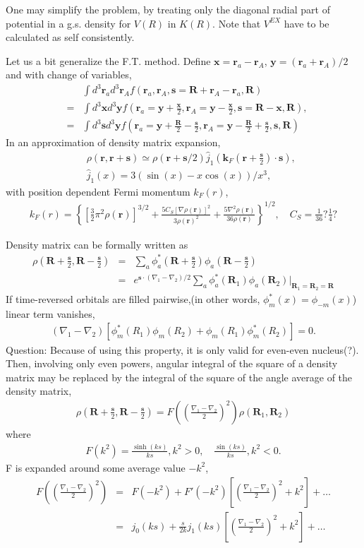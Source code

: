 \documentclass[11pt]{book}
\def\bm{\boldsymbol}
\def\vr{{\bm r}}
\def\vR{{\bm R}}
\newcommand{\bea}{\begin{eqnarray}}
\newcommand{\eea}{\end{eqnarray}}
\newcommand{\no}{\nonumber \\}
\begin{document}
One may simplify the problem, by treating only the diagonal radial part of potential 
in a g.s. density for $V(R)$ in $K(R)$. 
Note that $V^{EX}$ have to be calculated as self consistently. 

Let us a bit generalize the F.T. method. 
Define ${\bm x}={\bm r}_a-{\bm r}_A$, ${\bm y}=(\vr_a+\vr_A)/2$
and with change of variables, 
\bea 
& &\int d^3\vr_a d^3 \vr_A f(\vr_a,\vr_A,{\bm s}=\vR+\vr_A-\vr_a,\vR) \no 
&=&\int d^3{\bm x} d^3 {\bm y} f(\vr_a={\bm y}+\frac{{\bm x}}{2},
                               \vr_A={\bm y}-\frac{{\bm x}}{2},{\bm s}=\vR-{\bm x},\vR) ,\no 
&=&\int d^3{\bm s} d^3 {\bm y} f(\vr_a={\bm y}+\frac{{\bm R}}{2}-\frac{{\bm s}}{2},
\vr_A={\bm y}-\frac{{\bm R}}{2}+\frac{\bm s}{2},{\bm s},\vR)                                 
\eea 
In an approximation of density matrix expansion, 
\bea 
& &\rho(\vr,\vr+{\bm s}) \simeq \rho(\vr+{\bm s}/2)\hat{j}_1( {\bm k_F}(\vr+\frac{{\bm s}}{2})\cdot {\bm s}) ,\no 
& &\hat{j}_1(x) = 3(\sin(x)-x\cos(x))/x^3,
\eea 
with position dependent Fermi momentum $k_F(r)$,
\bea 
k_F(r) =\left\{  \left[\frac{3}{2}\pi^2\rho(\vr)   \right]^{3/2}
               +\frac{5 C_S[\nabla \rho(\vr)]^2} {3\rho(\vr)^2}
               +\frac{5\nabla^2\rho(\vr)}{36\rho(\vr)}
         \right\}^{1/2}, \quad C_S=\frac{1}{36}? \frac{1}{4}?
\eea 

Density matrix can be formally written as
\bea 
\rho(\vR+\frac{\bm s}{2},\vR-\frac{\bm s}{2})
&=&\sum_{a} \phi_a^*(\vR+\frac{\bm s}{2})\phi_a(\vR-\frac{\bm s}{2}) \no 
&=& e^{{\bm s}\cdot(\nabla_1-\nabla_2)/2}\sum_a \phi_a^*(\vR_1)\phi_a(\vR_2)|_{\vR_1=\vR_2=\vR}
\eea 
If time-reversed orbitals are filled pairwise,(in other words, $\phi^*_m(x)=\phi_{-m}(x)$) 
linear term vanishes,
\bea 
(\nabla_1-\nabla_2)[\phi_m^*(R_1)\phi_m(R_2)+\phi_m(R_1)\phi_m^*(R_2)]=0.
\eea 
Question: Because of using this property, it is only valid for even-even nucleus(?). 
Then, involving only even powers, angular integral of the square of a density matrix may be 
replaced by the integral of the square of the angle average of the density matrix, 
\bea 
\rho(\vR+\frac{\bm s}{2},\vR-\frac{\bm s}{2})
= F (  (\frac{\nabla_1-\nabla_2}{2})^2)\rho(\vR_1,\vR_2)
\eea 
where
\bea 
F(k^2)=\frac{\sinh(ks)}{ks}, k^2>0,\quad \frac{\sin(ks)}{ks}, k^2<0.
\eea 
F is expanded around some average value $-k^2$, 
\bea 
F (  (\frac{\nabla_1-\nabla_2}{2})^2)
 &=& F(-k^2)+F'(-k^2)\left[ (\frac{\nabla_1-\nabla_2}{2})^2+k^2\right]+\dots \no 
 &=& j_0(ks) +\frac{s}{2k} j_1(ks)\left[ (\frac{\nabla_1-\nabla_2}{2})^2+k^2\right]+\dots
\eea 
\end{document}

